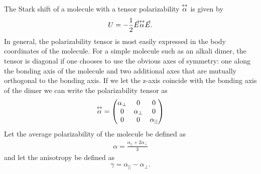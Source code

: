 The Stark shift of a molecule with a tensor polarizability $\overset{\leftrightarrow}{\alpha}$ is given by 
\begin{eqnarray}
U=-\frac{1}{2} \vec{E} \overset{\leftrightarrow}{\alpha} \vec{E}.
\end{eqnarray}
In general, the polarizability tensor is most easily expressed in the body coordinates of the molecule.  For a simple molecule such as an alkali dimer, the tensor is diagonal if one chooses to use the obvious axes of symmetry: one along the bonding axis of the molecule and two additional axes that are mutually orthogonal to the bonding axis. If we let the z-axis coincide with the bonding axis of the dimer we can write the polarizability tensor as
\begin{eqnarray}
\overset{\leftrightarrow}{\alpha} = 
	\begin{pmatrix}
		\alpha_\perp	&		0		&		0		\\
			0		&	\alpha_\perp	&		0		\\
			0		&		0		&	\alpha_{||}		\\
	\end{pmatrix}
\end{eqnarray}
Let the average polarizability of the molecule be defined as
\begin{eqnarray}
\alpha = \frac{\alpha_{||}+2\alpha_\perp}{3} 
\end{eqnarray}
and let the anisotropy be defined as
\begin{eqnarray}
\gamma = \alpha_{||} - \alpha_\perp.
\end{eqnarray}

